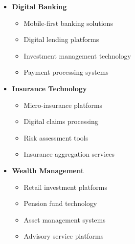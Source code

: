 \begin{tcolorbox}[colback=white,colframe=primarydark,title=\textbf{Financial Services Growth Areas}]
\begin{itemize}
    \item \textbf{Digital Banking}
    \begin{itemize}
        \item Mobile-first banking solutions
        \item Digital lending platforms
        \item Investment management technology
        \item Payment processing systems
    \end{itemize}

    \item \textbf{Insurance Technology}
    \begin{itemize}
        \item Micro-insurance platforms
        \item Digital claims processing
        \item Risk assessment tools
        \item Insurance aggregation services
    \end{itemize}

    \item \textbf{Wealth Management}
    \begin{itemize}
        \item Retail investment platforms
        \item Pension fund technology
        \item Asset management systems
        \item Advisory service platforms
    \end{itemize}
\end{itemize}
\end{tcolorbox}


